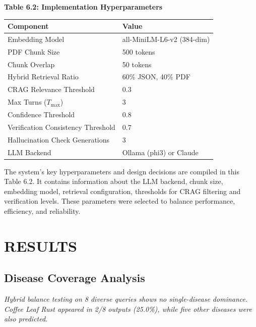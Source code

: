 \documentclass[conference]{IEEEtran}
\begin{document}
\begin{table}[htbp]
\centering
\textbf{Table 6.2: Implementation Hyperparameters}\\[2pt]
\begin{tabular}{|p{3.8cm}|p{2.9cm}|}
\hline
\textbf{Component} & \textbf{Value} \\
\hline
Embedding Model & all-MiniLM-L6-v2 (384-dim) \\
\hline
PDF Chunk Size & 500 tokens \\
\hline
Chunk Overlap & 50 tokens \\
\hline
Hybrid Retrieval Ratio & 60\% JSON, 40\% PDF \\
\hline
CRAG Relevance Threshold & 0.3 \\
\hline
Max Turns ($T_{\max}$) & 3 \\
\hline
Confidence Threshold & 0.8 \\
\hline
Verification Consistency Threshold & 0.7 \\
\hline
Hallucination Check Generations & 3 \\
\hline
LLM Backend & Ollama (phi3) or Claude \\
\hline
\end{tabular}
\par\medskip
\noindent The system's key hyperparameters and design decisions are compiled in this Table 6.2. It contains information about the LLM backend, chunk size, embedding model, retrieval configuration, thresholds for CRAG filtering and verification levels. These parameters were selected to balance performance, efficiency, and reliability.
\label{tab2}
\end{table}

\section{RESULTS}

\subsection{Disease Coverage Analysis}

\textit{Hybrid balance testing on 8 diverse queries shows no single-disease dominance. Coffee Leaf Rust appeared in 2/8 outputs (25.0\%), while five other diseases were also predicted.}
\end{document}
